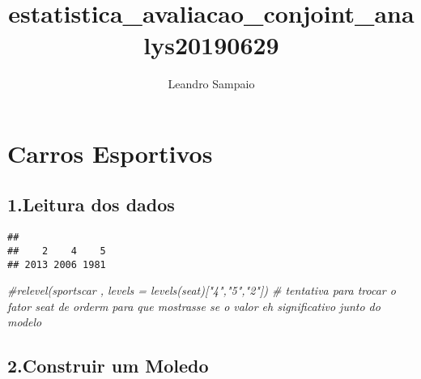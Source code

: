 \documentclass[]{article}
\title{estatistica\_avaliacao\_conjoint\_analys20190629}
\author{Leandro Sampaio}
\date{}
\newenvironment{Shaded}{\begin{snugshade}}{\end{snugshade}}
\newcommand{\CommentTok}[1]{\textcolor[rgb]{0.56,0.35,0.01}{\textit{#1}}}
\newcommand{\DataTypeTok}[1]{\textcolor[rgb]{0.13,0.29,0.53}{#1}}
\newcommand{\KeywordTok}[1]{\textcolor[rgb]{0.13,0.29,0.53}{\textbf{#1}}}
\newcommand{\NormalTok}[1]{#1}
\newcommand{\OperatorTok}[1]{\textcolor[rgb]{0.81,0.36,0.00}{\textbf{#1}}}
\newcommand{\StringTok}[1]{\textcolor[rgb]{0.31,0.60,0.02}{#1}}
\begin{document}
\maketitle

\hypertarget{carros-esportivos}{%
\section{Carros Esportivos}\label{carros-esportivos}}

\hypertarget{leitura-dos-dados}{%
\subsection{1.Leitura dos dados}\label{leitura-dos-dados}}

\begin{Shaded}
\end{Shaded}

\begin{verbatim}
## 
##    2    4    5 
## 2013 2006 1981
\end{verbatim}

\begin{Shaded}
\begin{Highlighting}[]
\CommentTok{#relevel(sportscar , levels = levels(seat)["4","5","2"]) # tentativa para trocar o fator seat de orderm para que mostrasse se o valor eh significativo junto do modelo }
\end{Highlighting}
\end{Shaded}

\hypertarget{construir-um-moledo}{%
\subsection{2.Construir um Moledo}\label{construir-um-moledo}}
\end{document}

